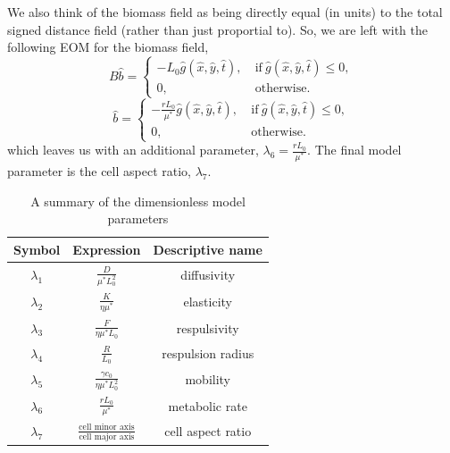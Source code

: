  We also think of the biomass
field as being directly equal (in units) to the total signed distance field (rather than just proportial to).
So, we are left with the following EOM for the biomass field,
\begin{equation*}
    B\hat{b} = \begin{cases}
                -  L_0\hat{g}(\hat{x},\hat{y},\hat{t}), & \ \textrm{if} \ \hat{g}(\hat{x},\hat{y},\hat{t}) \leq 0, \\
                    0, &    \ \textrm{otherwise}.
               \end{cases}
\end{equation*}
\begin{equation*}
    \hat{b} = \begin{cases}
                -  \frac{r L_0}{\mu^*}\hat{g}(\hat{x},\hat{y},\hat{t}), & \ \textrm{if} \ \hat{g}(\hat{x},\hat{y},\hat{t}) \leq 0, \\
                    0, &    \ \textrm{otherwise}.
               \end{cases}
\end{equation*}
which leaves us with an additional parameter, $\lambda_6 =\frac{r L_0}{\mu^*}$. The final model parameter is the cell aspect ratio, $\lambda_7$.


\begin{table}[h]
\begin{center}
    \begin{tabular}{ |c|c|c| } 
     \hline
      \textbf{Symbol} & \textbf{Expression} & \textbf{Descriptive name} \\ 
      \hline
     $\lambda_1$ & $\frac{D}{ \mu^* L_0^2}$ & diffusivity \\ 
     $\lambda_2$ & $\frac{K}{ \eta \mu^*}$ & elasticity \\ 
     $\lambda_3$ & $\frac{F}{  \eta \mu^* L_0}$ & respulsivity \\ 
     $\lambda_4$ & $\frac{R}{L_0}$ & respulsion radius \\ 
     $\lambda_5$ & $\frac{\gamma c_0}{ \eta \mu^* L_0^2}$ & mobility \\ 
     $\lambda_6$ & $\frac{r L_0}{\mu^*}$ & metabolic rate \\ 
     $\lambda_7$ & $\frac{\textrm{cell minor axis}}{\textrm{cell major axis}}$ & cell aspect ratio \\ 
     \hline
     
    \end{tabular}
    
\end{center}
\caption{A summary of the dimensionless model parameters}
\end{table}

